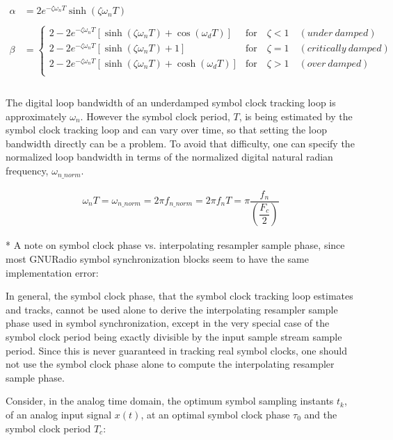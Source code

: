 \documentclass{article}
\begin{document}
\begin{align*}
   \alpha &= 2e^{-\zeta\omega_{n}T} \sinh(\zeta\omega_{n}T) \\
\\
   \beta  &=
      \begin{cases}
         2
         -2e^{-\zeta\omega_{n}T} [\sinh(\zeta\omega_{n}T) + \cos(\omega_{d}T)] &
         \text{for} \quad \zeta < 1 \quad (under \: damped)\\
         2
         -2e^{-\zeta\omega_{n}T} [\sinh(\zeta\omega_{n}T) + 1] &
         \text{for} \quad \zeta = 1 \quad (critically \: damped)\\
         2
         -2e^{-\zeta\omega_{n}T} [\sinh(\zeta\omega_{n}T) +\cosh(\omega_{d}T)] &
         \text{for} \quad \zeta > 1 \quad (over \: damped)\\
      \end{cases} \\
\\
\end{align*}

The digital loop bandwidth of an underdamped symbol clock tracking loop is
approximately $\omega_{n}$.  However the symbol clock period, $T$, is being
estimated by the symbol clock tracking loop and can vary over time, so that
setting the loop bandwidth directly can be a problem.  To avoid that difficulty,
one can specify the normalized loop bandwidth in terms of the normalized digital
natural radian frequency, $\omega_{n\_norm}$.

\begin{align*}
    \omega_{n}T = \omega_{n\_norm} = 2 \pi f_{n\_norm} = 2 \pi f_{n} T =
    \pi \dfrac{f_{n}}{\left(\dfrac{F_{c}}{2}\right)}
\end{align*}

* A note on symbol clock phase vs. interpolating resampler sample phase,
since most GNURadio symbol synchronization blocks seem to have the same
implementation error:

In general, the symbol clock phase, that the symbol clock tracking loop
estimates and tracks, cannot be used alone to derive the interpolating resampler
sample phase used in symbol synchronization, except in the very special case of
the symbol clock period being exactly divisible by the input sample stream
sample period.  Since this is never guaranteed in tracking real symbol clocks,
one should not use the symbol clock phase alone to compute the interpolating
resampler sample phase.

Consider, in the analog time domain, the optimum symbol sampling instants
$t_{k}$, of an analog input signal $x(t)$, at an optimal symbol clock
phase $\tau_{0}$ and the symbol clock period $T_{c}$:
\end{document}
